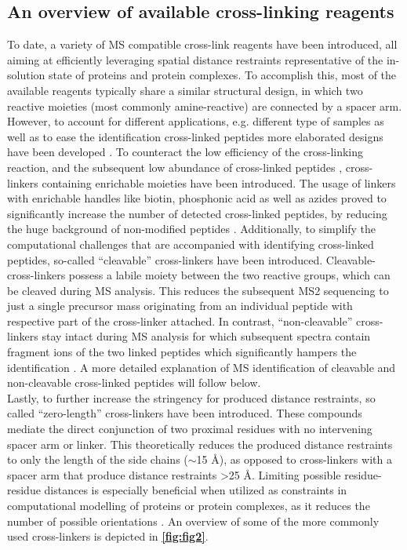 \subsection*{An overview of available cross-linking reagents}
To date, a variety of MS compatible cross-link reagents have been introduced, all aiming at efficiently leveraging spatial distance restraints representative of the in-solution state of proteins and protein complexes. To accomplish this, most of the available reagents typically share a similar structural design, in which two reactive moieties (most commonly amine-reactive) are connected by a spacer arm. However, to account for different applications, e.g. different type of samples as well as to ease the identification cross-linked peptides more elaborated designs have been developed \cite{Steigenberger_2020}. To counteract the low efficiency of the cross-linking reaction, and the subsequent low abundance of cross-linked peptides \cite{Leitner_2014, Leitner_2010}, cross-linkers containing enrichable moieties have been introduced. The usage of linkers with enrichable handles like biotin, phosphonic acid as well as azides proved to significantly increase the number of detected cross-linked peptides, by reducing the huge background of non-modified peptides \cite{Matzinger_2020, Steigenberger_2019, Tan_2016}. Additionally, to simplify the computational challenges that are accompanied with identifying cross-linked peptides, so-called “cleavable” cross-linkers have been introduced. Cleavable-cross-linkers possess a labile moiety between the two reactive groups, which can be cleaved during MS analysis. This reduces the subsequent MS2 sequencing to just a single precursor mass originating from an individual peptide with respective part of the cross-linker attached. In contrast, “non-cleavable” cross-linkers stay intact during MS analysis for which subsequent spectra contain fragment ions of the two linked peptides which significantly hampers the identification \cite{Kao_2011}. A more detailed explanation of MS identification of cleavable and non-cleavable cross-linked peptides will follow below.\\
Lastly, to further increase the stringency for produced distance restraints, so called “zero-length” cross-linkers have been introduced. These compounds mediate the direct conjunction of two proximal residues with no intervening spacer arm or linker. This theoretically reduces the produced distance restraints to only the length of the side chains ($\sim$15 Å), as opposed to cross-linkers with a spacer arm that produce distance restraints >25 Å. Limiting possible residue-residue distances is especially beneficial when utilized as constraints in computational modelling of proteins or protein complexes, as it reduces the number of possible orientations \cite{Leitner_2014}. An overview of some of the more commonly used cross-linkers is depicted in \textbf{\autoref{fig:fig2}}.

